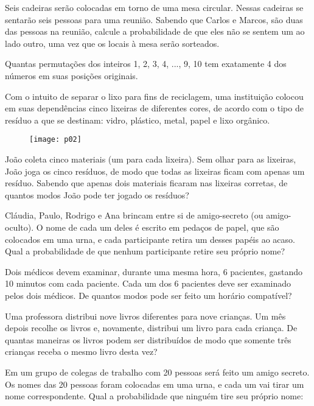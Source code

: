 \documentclass[twocolumn,oneside,a4paper,12pt]{article}
\begin{document}
\begin{exemplo}
Seis cadeiras serão colocadas em torno de uma mesa circular. Nessas cadeiras se sentarão seis pessoas para uma reunião. Sabendo que Carlos e Marcos, são duas das pessoas na reunião, calcule a probabilidade de que eles não se sentem um ao lado outro, uma vez que os locais à mesa serão sorteados.
\end{exemplo}

\begin{exemplo}
Quantas permutações dos inteiros 1, 2, 3, 4, ..., 9, 10 tem exatamente 4 dos números em suas posições originais.
\end{exemplo}

\begin{exemplo}
Com o intuito de separar o lixo para fins de reciclagem, uma instituição colocou em suas dependências cinco lixeiras de diferentes cores, de acordo com o tipo de resíduo a que se destinam: vidro, plástico, metal, papel e lixo orgânico.

	\begin{figure}[!tbh]
	\center
	\texttt{[image: p02]}
	\end{figure}

\noindent João coleta cinco materiais (um para cada lixeira). Sem olhar para as lixeiras, João joga os cinco resíduos, de modo que todas as lixeiras ficam com apenas um resíduo. Sabendo que apenas dois materiais ficaram nas lixeiras corretas, de quantos modos João pode ter jogado os resíduos?
\end{exemplo}

\begin{exemplo}
Cláudia, Paulo, Rodrigo e Ana brincam entre si de amigo-secreto (ou amigo-oculto). O nome de cada um deles é escrito em pedaços de papel, que são colocados em uma urna, e cada participante retira um desses papéis ao acaso. Qual a probabilidade de que nenhum participante retire seu próprio nome?
\end{exemplo}

\begin{exemplo}
Dois médicos devem examinar, durante uma mesma hora, 6 pacientes, gastando 10 minutos com cada paciente. Cada um dos 6 pacientes deve ser examinado pelos dois médicos.
De quantos modos pode ser feito um horário compatível?
\end{exemplo}

\begin{exemplo}
Uma professora distribui nove livros diferentes para nove crianças. Um mês depois recolhe os livros e, novamente, distribui um livro para cada criança. De quantas maneiras os livros podem ser distribuídos de modo que somente três crianças receba o mesmo livro desta vez?
\end{exemplo}

\begin{exemplo}
Em um grupo de colegas de trabalho com 20 pessoas será feito um amigo secreto. Os nomes das 20 pessoas foram colocadas em uma urna, e cada um vai tirar um nome correspondente. Qual a probabilidade que ninguém tire seu próprio nome:
\end{exemplo} 
\end{document}
